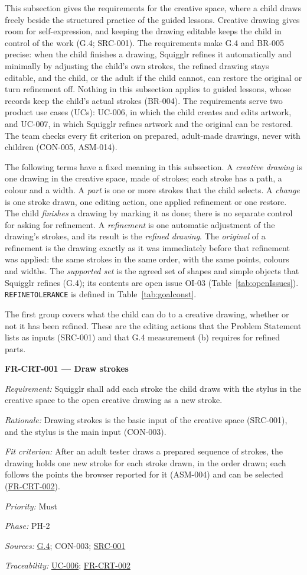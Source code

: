 \documentclass[12pt]{article}
\renewcommand{\_}{\textunderscore\allowbreak}%
\newcommand{\goalref}[1]{\hyperref[goal:#1]{G.#1}}
\newcommand{\ucref}[1]{\hyperref[uc:#1]{\mbox{UC-#1}}}
\newenvironment{srsrequirement}[2]{%
  \par\medskip\noindent\phantomsection\label{req:#1}%
  \textbf{#1 --- #2}\par\nobreak\smallskip }{\par\medskip}
\newcommand{\reqfield}[2]{\noindent\textit{#1:} #2\par}
\newcommand{\reqshall}[1]{\reqfield{Requirement}{#1}}
\newcommand{\reqrationale}[1]{\reqfield{Rationale}{#1}}
\newcommand{\reqfit}[1]{\reqfield{Fit criterion}{#1}}
\newcommand{\reqpriority}[1]{\reqfield{Priority}{#1}}
\newcommand{\reqphase}[1]{\reqfield{Phase}{#1}}
\newcommand{\reqsources}[1]{\reqfield{Sources}{#1}}
\newcommand{\reqtraces}[1]{\reqfield{Traceability}{#1}}
\newcommand{\reqref}[1]{\hyperref[req:#1]{#1}}
\newcommand{\srcref}[1]{\hyperref[src:#1]{SRC-#1}}
\providecommand{\ucref}[1]{\hyperref[uc:#1]{UC-#1}}
\begin{document}
This subsection gives the requirements for the creative space, where a child
draws freely beside the structured practice of the guided lessons. Creative
drawing gives room for self-expression, and keeping the drawing editable keeps
the child in control of the work (G.4; SRC-001). The requirements make G.4 and
BR-005 precise: when the child finishes a drawing, Squigglr refines it
automatically and minimally by adjusting the child's own strokes, the refined
drawing stays editable, and the child, or the adult if the child cannot, can
restore the original or turn refinement off. Nothing in this subsection applies
to guided lessons, whose records keep the child's actual strokes (BR-004). The
requirements serve two product use cases (UCs): UC-006, in which the child
creates and edits artwork, and UC-007, in which Squigglr refines artwork and the
original can be restored. The team checks every fit criterion on prepared,
adult-made drawings, never with children (CON-005, ASM-014).

The following terms have a fixed meaning in this subsection. A \emph{creative
drawing} is one drawing in the creative space, made of strokes; each stroke has
a path, a colour and a width. A \emph{part} is one or more strokes that the
child selects. A \emph{change} is one stroke drawn, one editing action, one
applied refinement or one restore. The child \emph{finishes} a drawing by
marking it as done; there is no separate control for asking for refinement. A
\emph{refinement} is one automatic adjustment of the drawing's strokes, and its
result is the \emph{refined drawing}. The \emph{original} of a refinement is the
drawing exactly as it was immediately before that refinement was applied: the
same strokes in the same order, with the same points, colours and widths. The
\emph{supported set} is the agreed set of shapes and simple objects that
Squigglr refines (G.4); its contents are open issue OI-03
(Table~\ref{tab:openIssues}). \texttt{REFINE\_TOLERANCE} is defined in
Table~\ref{tab:goalconst}.

The first group covers what the child can do to a creative drawing, whether or
not it has been refined. These are the editing actions that the Problem
Statement lists as inputs (SRC-001) and that G.4 measurement (b) requires for
refined parts.

\begin{srsrequirement}{FR-CRT-001}{Draw strokes}
  \reqshall{Squigglr shall add each stroke the child draws with the stylus in
the creative space to the open creative drawing as a new stroke.}
\reqrationale{Drawing strokes is the basic input of the creative space
(SRC-001), and the stylus is the main input (CON-003).} \reqfit{After an adult
tester draws a prepared sequence of strokes, the drawing holds one new stroke
for each stroke drawn, in the order drawn; each follows the points the browser
reported for it (ASM-004) and can be selected (\reqref{FR-CRT-002}).}
  \reqpriority{Must}
  \reqphase{PH-2}
  \reqsources{\goalref{4}; CON-003; \srcref{001}} \reqtraces{\ucref{006};
  \reqref{FR-CRT-002}}
\end{srsrequirement}
\end{document}
